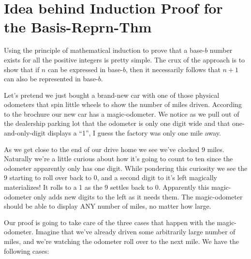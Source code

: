 \documentclass{article}
\begin{document}
\section*{Idea behind Induction Proof for the Basis-Reprn-Thm}
Using the
principle of mathematical induction 
to prove that a base-$b$ number exists for all the positive integers is pretty simple.
The crux of the approach is to show that if $n$ can be expressed in base-$b$,
then it necessarily follows that $n+1$ can also be represented in base-$b$.

Let's pretend we just bought a brand-new car with one of those physical odometers that
spin little wheels to show the number of miles driven. According
to the brochure our new car has a magic-odometer.
We notice as we
pull out of the dealership parking lot that
the odometer is only one digit wide and
that one-and-only-digit displays a ``1'', I guess the factory was only one mile away.

As we get close to the end of our drive home
we see we've clocked 9 miles.
Naturally we're a little curious about how it's going to
count to ten since the odometer apparently only has one digit.
While pondering this curiosity we see the 9 starting to roll
over back to 0, and a second digit to it's left magically materializes!
It rolls to a 1 as the 9 settles back to 0.
Apparently this magic-odometer only adds new digits to the left
as it needs them.
The magic-odometer should be able to display ANY number of miles, no matter how large.

\break
Our proof is going to take care of the three cases that happen with
the magic-odometer. Imagine that we've already driven some arbitrarily large
number of miles, and we're watching the odometer roll over to the
next mile. We have the following cases:
\end{document}
